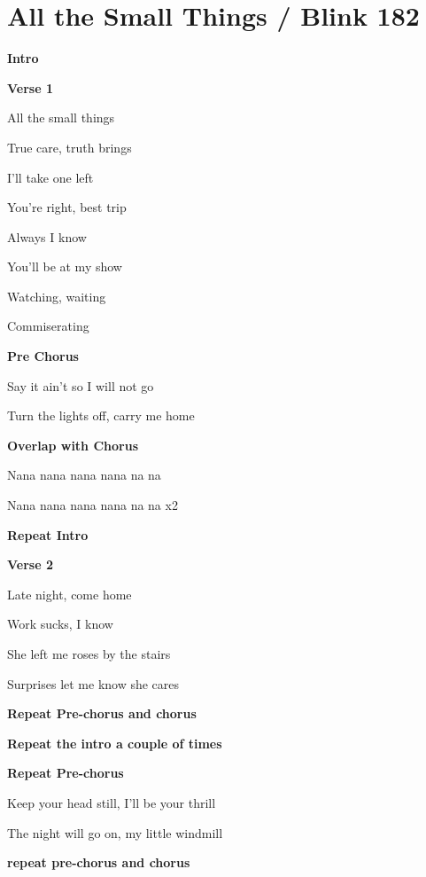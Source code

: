 \section{All the Small Things / Blink 182}\label{sec:allthesmallthings}
\Cmajor
\Gmajor
\Fmajor

\textbf{Intro}  

     

\textbf{Verse 1}

All the small things

True care, truth brings

I'll take one left

You're right, best trip

Always I know

You'll be at my show

Watching, waiting

Commiserating     

\textbf{Pre Chorus}

Say it ain't so I will not go

Turn the lights off, carry me home

\textbf{Overlap with Chorus}

Nana nana nana nana na na

Nana nana nana nana na na  x2

\textbf{Repeat Intro}

\textbf{Verse 2}

Late night, come home

Work sucks, I know

She left me roses by the stairs

Surprises let me know she cares

\textbf{Repeat Pre-chorus and chorus}

\textbf{Repeat the intro a couple of times}

\textbf{Repeat Pre-chorus}

Keep your head still, I'll be your thrill

The night will go on, my little windmill

\textbf{repeat pre-chorus and chorus}

